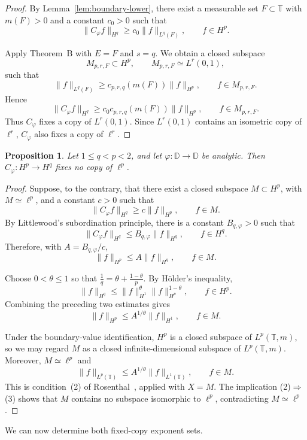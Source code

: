 \documentclass[10pt,a4paper]{amsart}
\newtheorem{proposition}[theorem]{Proposition}
\newcommand{\D}{\mathbb{D}}
\newcommand{\T}{\mathbb{T}}
\begin{document}
\begin{proof}
By Lemma~\ref{lem:boundary-lower}, there exist a
measurable set \(F\subset\T\) with \(m(F)>0\) and a constant
\(c_0>0\) such that
\[
        \|C_\varphi f\|_{H^q}
        \ge
        c_0\|f\|_{L^q(F)},
        \qquad
        f\in H^p.
\]

Apply Theorem~B with \(E=F\) and \(s=q\). We obtain a closed subspace
\[
        M_{p,r,F}\subset H^p,
        \qquad
        M_{p,r,F}\simeq L^r(0,1),
\]
such that
\[
        \|f\|_{L^q(F)}
        \ge
        c_{p,r,q}(m(F))\|f\|_{H^p},
        \qquad
        f\in M_{p,r,F}.
\]
Hence
\[
        \|C_\varphi f\|_{H^q}
        \ge
        c_0c_{p,r,q}(m(F))\|f\|_{H^p},
        \qquad
        f\in M_{p,r,F}.
\]
Thus \(C_\varphi\) fixes a copy of \(L^r(0,1)\). Since
\(L^r(0,1)\) contains an isometric copy of \(\ell^r\),
\(C_\varphi\) also fixes a copy of \(\ell^r\).
\end{proof}

\begin{proposition}
\label{prop:ellp-singular}
Let \(1\le q<p<2\), and let \(\varphi:\D\to\D\) be analytic. Then
\(C_\varphi:H^p\to H^q\) fixes no copy of \(\ell^p\).
\end{proposition}

\begin{proof}
Suppose, to the contrary, that there exist a closed subspace
\(M\subset H^p\), with \(M\simeq\ell^p\), and a constant \(c>0\)
such that
\[
        \|C_\varphi f\|_{H^q}
        \ge
        c\|f\|_{H^p},
        \qquad
        f\in M.
\]
By Littlewood's subordination principle, there is a constant
\(B_{q,\varphi}>0\) such that
\[
        \|C_\varphi f\|_{H^q}
        \le
        B_{q,\varphi}\|f\|_{H^q},
        \qquad
        f\in H^q.
\]
Therefore, with \(A=B_{q,\varphi}/c\),
\[
        \|f\|_{H^p}
        \le
        A\|f\|_{H^q},
        \qquad
        f\in M.
\]

Choose \(0<\theta\leq 1\) so that
\(\frac1q=\theta+\frac{1-\theta}{p}\).
By H\"older's inequality,
\[
        \|f\|_{H^q}
        \le
        \|f\|_{H^1}^{\theta}
        \|f\|_{H^p}^{1-\theta},
        \qquad
        f\in H^p.
\]
Combining the preceding two estimates gives
\[
        \|f\|_{H^p}
        \le
        A^{1/\theta}\|f\|_{H^1},
        \qquad
        f\in M.
\]

Under the boundary-value identification,
\(H^p\) is a closed subspace of \(L^p(\T,m)\), so we may regard
\(M\) as a closed infinite-dimensional subspace of \(L^p(\T,m)\).
Moreover, \(M\simeq\ell^p\) and
\[
        \|f\|_{L^p(\T)}
        \le
        A^{1/\theta}\|f\|_{L^1(\T)},
        \qquad
        f\in M.
\]
This is condition~\textup{(2)} of
Rosenthal~\cite[Theorem~13, p.~370]{Rosenthal1973}, applied with
\(X=M\). 
The implication
\textup{(2)}\(\Rightarrow\)\textup{(3)} shows that \(M\) contains no
subspace isomorphic to \(\ell^p\), contradicting \(M\simeq\ell^p\).
\end{proof}
We can now determine both fixed-copy exponent sets.
\end{document}
